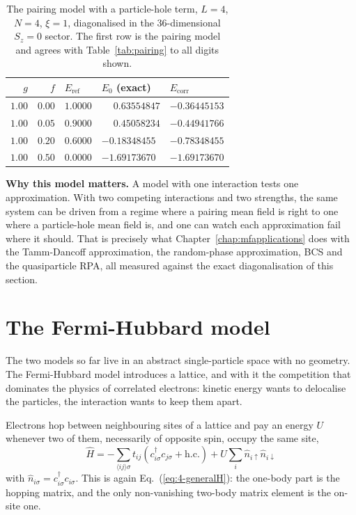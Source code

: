 \begin{table}[h]
\centering
\renewcommand{\arraystretch}{1.25}
\setlength{\tabcolsep}{12pt}
\begin{tabular}{rrlll}
\toprule
$g$ & $f$ & $E_{\mathrm{ref}}$ & $E_0$ (exact) & $E_{\mathrm{corr}}$\\
\midrule
$1.00$ & $0.00$ & $1.0000$ & $\phantom{-}0.63554847$ & $-0.36445153$\\
$1.00$ & $0.05$ & $0.9000$ & $\phantom{-}0.45058234$ & $-0.44941766$\\
$1.00$ & $0.20$ & $0.6000$ & $-0.18348455$ & $-0.78348455$\\
$1.00$ & $0.50$ & $0.0000$ & $-1.69173670$ & $-1.69173670$\\
\bottomrule
\end{tabular}
\caption{The pairing model with a particle-hole term, $L=4$, $N=4$, $\xi=1$,
diagonalised in the $36$-dimensional $S_z=0$ sector.  The first row is the
pairing model and agrees with Table~\ref{tab:pairing} to all digits shown.}
\label{tab:pairingph}
\end{table}

\begin{notebox}
\textbf{Why this model matters.} A model with one interaction tests one
approximation.  With two competing interactions and two strengths, the same
system can be driven from a regime where a pairing mean field is right to one
where a particle-hole mean field is, and one can watch each approximation fail
where it should.  That is precisely what Chapter~\ref{chap:mfapplications}
does with the Tamm-Dancoff approximation, the random-phase approximation, BCS
and the quasiparticle RPA, all measured against the exact diagonalisation of
this section.
\end{notebox}

\section{The Fermi-Hubbard model}
\label{sec:hubbard}

The two models so far live in an abstract single-particle space with no
geometry.  The Fermi-Hubbard model introduces a lattice, and with it the
competition that dominates the physics of correlated electrons: kinetic energy
wants to delocalise the particles, the interaction wants to keep them apart.

Electrons hop between neighbouring sites of a lattice and pay an energy $U$
whenever two of them, necessarily of opposite spin, occupy the same site,
\begin{equation}
  \boxed{\;
  \hat{H} = -\sum_{\langle ij\rangle\sigma} t_{ij}
    \left(c^{\dagger}_{i\sigma}c_{j\sigma} + \mathrm{h.c.}\right)
  + U\sum_i \hat{n}_{i\uparrow}\hat{n}_{i\downarrow} \;}
  \label{eq:4-hubbardH}
\end{equation}
with $\hat{n}_{i\sigma}=c^{\dagger}_{i\sigma}c_{i\sigma}$.  This is again
Eq.~(\ref{eq:4-generalH}): the one-body part is the hopping matrix, and the
only non-vanishing two-body matrix element is the on-site one.

